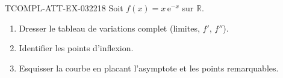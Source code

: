 \begin{exercice}{TCOMPL-ATT-EX-032}{2}{18}
Soit $f(x) = x\,\mathrm{e}^{-x}$ sur $\mathbb{R}$.
\begin{enumerate}
  \item Dresser le tableau de variations complet (limites, $f'$, $f''$).
  \item Identifier les points d'inflexion.
  \item Esquisser la courbe en placant l'asymptote et les points remarquables.
\end{enumerate}

\end{exercice}
